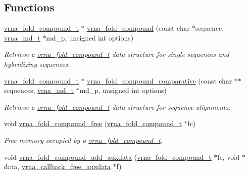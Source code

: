 \subsection*{Functions}
\begin{DoxyCompactItemize}
\item 
\hyperlink{group__fold__compound_ga1b0cef17fd40466cef5968eaeeff6166}{vrna\+\_\+fold\+\_\+compound\+\_\+t} $\ast$ \hyperlink{group__fold__compound_ga6601d994ba32b11511b36f68b08403be}{vrna\+\_\+fold\+\_\+compound} (const char $\ast$sequence, \hyperlink{group__model__details_ga1f8a10e12a0a1915f2a4eff0b28ea17c}{vrna\+\_\+md\+\_\+t} $\ast$md\+\_\+p, unsigned int options)
\begin{DoxyCompactList}\small\item\em Retrieve a \hyperlink{group__fold__compound_ga1b0cef17fd40466cef5968eaeeff6166}{vrna\+\_\+fold\+\_\+compound\+\_\+t} data structure for single sequences and hybridizing sequences. \end{DoxyCompactList}\item 
\hyperlink{group__fold__compound_ga1b0cef17fd40466cef5968eaeeff6166}{vrna\+\_\+fold\+\_\+compound\+\_\+t} $\ast$ \hyperlink{group__fold__compound_gad6bacc816af274922b13d947f708aa0c}{vrna\+\_\+fold\+\_\+compound\+\_\+comparative} (const char $\ast$$\ast$sequences, \hyperlink{group__model__details_ga1f8a10e12a0a1915f2a4eff0b28ea17c}{vrna\+\_\+md\+\_\+t} $\ast$md\+\_\+p, unsigned int options)
\begin{DoxyCompactList}\small\item\em Retrieve a \hyperlink{group__fold__compound_ga1b0cef17fd40466cef5968eaeeff6166}{vrna\+\_\+fold\+\_\+compound\+\_\+t} data structure for sequence alignments. \end{DoxyCompactList}\item 
void \hyperlink{group__fold__compound_ga576a077b418a9c3650e06f8e5d296fc2}{vrna\+\_\+fold\+\_\+compound\+\_\+free} (\hyperlink{group__fold__compound_ga1b0cef17fd40466cef5968eaeeff6166}{vrna\+\_\+fold\+\_\+compound\+\_\+t} $\ast$fc)
\begin{DoxyCompactList}\small\item\em Free memory occupied by a \hyperlink{group__fold__compound_ga1b0cef17fd40466cef5968eaeeff6166}{vrna\+\_\+fold\+\_\+compound\+\_\+t}. \end{DoxyCompactList}\item 
void \hyperlink{group__fold__compound_gafc44c76a1aacf61bfccb8cd698772b98}{vrna\+\_\+fold\+\_\+compound\+\_\+add\+\_\+auxdata} (\hyperlink{group__fold__compound_ga1b0cef17fd40466cef5968eaeeff6166}{vrna\+\_\+fold\+\_\+compound\+\_\+t} $\ast$fc, void $\ast$data, \hyperlink{group__fold__compound_ga7806651f51b195013839a218b3bbd5a3}{vrna\+\_\+callback\+\_\+free\+\_\+auxdata} $\ast$f)
$$
\end{DoxyCompactItemize}
